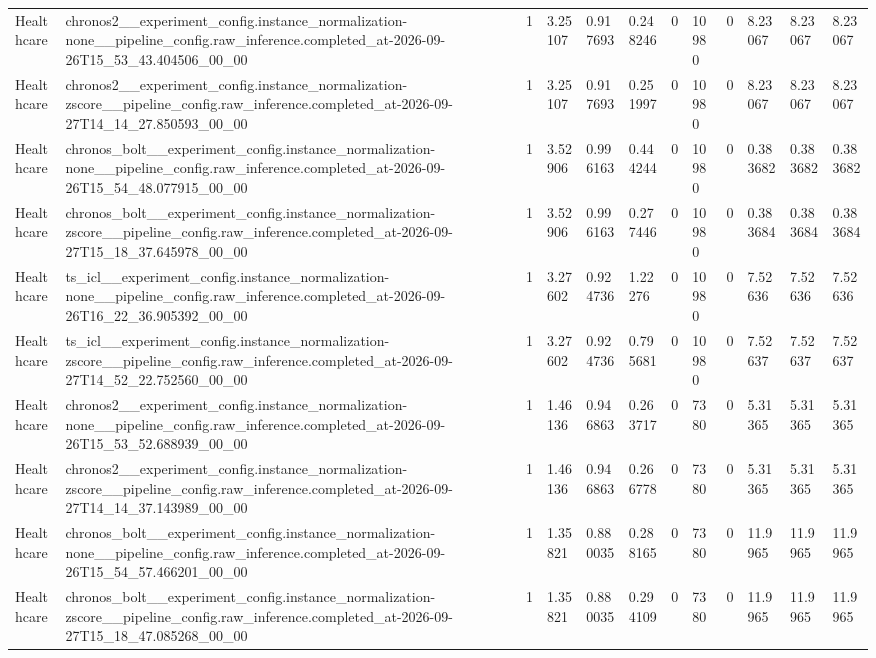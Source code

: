\begin{tabular}{llllllllllll}
Healthcare & chronos2\_\_experiment\_config.instance\_normalization-none\_\_pipeline\_config.raw\_inference.completed\_at-2026-09-26T15\_53\_43.404506\_00\_00 & 1 & 3.25107 & 0.917693 & 0.248246 & 0 & 10980 & 0 & 8.23067 & 8.23067 & 8.23067 \\
Healthcare & chronos2\_\_experiment\_config.instance\_normalization-zscore\_\_pipeline\_config.raw\_inference.completed\_at-2026-09-27T14\_14\_27.850593\_00\_00 & 1 & 3.25107 & 0.917693 & 0.251997 & 0 & 10980 & 0 & 8.23067 & 8.23067 & 8.23067 \\
Healthcare & chronos\_bolt\_\_experiment\_config.instance\_normalization-none\_\_pipeline\_config.raw\_inference.completed\_at-2026-09-26T15\_54\_48.077915\_00\_00 & 1 & 3.52906 & 0.996163 & 0.444244 & 0 & 10980 & 0 & 0.383682 & 0.383682 & 0.383682 \\
Healthcare & chronos\_bolt\_\_experiment\_config.instance\_normalization-zscore\_\_pipeline\_config.raw\_inference.completed\_at-2026-09-27T15\_18\_37.645978\_00\_00 & 1 & 3.52906 & 0.996163 & 0.277446 & 0 & 10980 & 0 & 0.383684 & 0.383684 & 0.383684 \\
Healthcare & ts\_icl\_\_experiment\_config.instance\_normalization-none\_\_pipeline\_config.raw\_inference.completed\_at-2026-09-26T16\_22\_36.905392\_00\_00 & 1 & 3.27602 & 0.924736 & 1.22276 & 0 & 10980 & 0 & 7.52636 & 7.52636 & 7.52636 \\
Healthcare & ts\_icl\_\_experiment\_config.instance\_normalization-zscore\_\_pipeline\_config.raw\_inference.completed\_at-2026-09-27T14\_52\_22.752560\_00\_00 & 1 & 3.27602 & 0.924736 & 0.795681 & 0 & 10980 & 0 & 7.52637 & 7.52637 & 7.52637 \\
Healthcare & chronos2\_\_experiment\_config.instance\_normalization-none\_\_pipeline\_config.raw\_inference.completed\_at-2026-09-26T15\_53\_52.688939\_00\_00 & 1 & 1.46136 & 0.946863 & 0.263717 & 0 & 7380 & 0 & 5.31365 & 5.31365 & 5.31365 \\
Healthcare & chronos2\_\_experiment\_config.instance\_normalization-zscore\_\_pipeline\_config.raw\_inference.completed\_at-2026-09-27T14\_14\_37.143989\_00\_00 & 1 & 1.46136 & 0.946863 & 0.266778 & 0 & 7380 & 0 & 5.31365 & 5.31365 & 5.31365 \\
Healthcare & chronos\_bolt\_\_experiment\_config.instance\_normalization-none\_\_pipeline\_config.raw\_inference.completed\_at-2026-09-26T15\_54\_57.466201\_00\_00 & 1 & 1.35821 & 0.880035 & 0.288165 & 0 & 7380 & 0 & 11.9965 & 11.9965 & 11.9965 \\
Healthcare & chronos\_bolt\_\_experiment\_config.instance\_normalization-zscore\_\_pipeline\_config.raw\_inference.completed\_at-2026-09-27T15\_18\_47.085268\_00\_00 & 1 & 1.35821 & 0.880035 & 0.294109 & 0 & 7380 & 0 & 11.9965 & 11.9965 & 11.9965 \\

\end{tabular}
